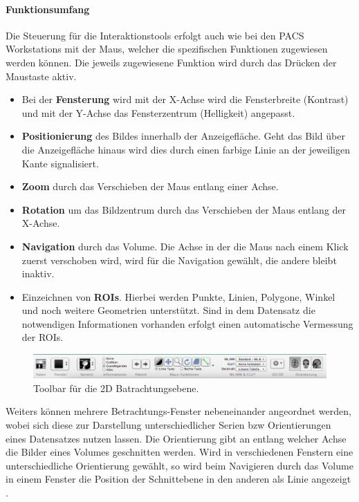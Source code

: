 \paragraph{Funktionsumfang}
Die Steuerung für die Interaktionstools erfolgt auch wie bei den PACS Workstations mit der Maus, 
welcher die spezifischen Funktionen zugewiesen werden können. Die jeweils zugewiesene Funktion wird durch das Drücken der Maustaste aktiv.
\begin{itemize}
	\item Bei der \textbf{Fensterung} wird mit der X-Achse wird die Fensterbreite (Kontrast) und mit der Y-Achse das Fensterzentrum (Helligkeit) angepasst.
	\item \textbf{Positionierung} des Bildes innerhalb der Anzeigefläche. Geht das Bild über die Anzeigefläche hinaus wird dies durch einen farbige Linie an der jeweiligen Kante signalisiert.
	\item \textbf{Zoom} durch das Verschieben der Maus entlang einer Achse.
	\item \textbf{Rotation} um das Bildzentrum durch das Verschieben  der Maus entlang der X-Achse.
	\item \textbf{Navigation} durch das Volume. Die Achse in der die Maus nach einem Klick zuerst verschoben wird, wird für die Navigation gewählt, die andere bleibt inaktiv.
	\item Einzeichnen von \textbf{ROIs}. Hierbei werden Punkte, Linien, Polygone, Winkel und noch weitere Geometrien unterstützt. 
		Sind in dem Datensatz die notwendigen Informationen vorhanden erfolgt einen automatische Vermessung der ROIs.
\end{itemize}
\begin{figure}[t]
	\centering
	\includegraphics[width=0.8\linewidth]{img/c2_osirix_2d_view_toolbar.jpg}
	\caption{Toolbar für die 2D Batrachtungsebene.}
\end{figure}
Weiters können mehrere Betrachtungs-Fenster nebeneinander angeordnet werden, wobei sich diese zur Darstellung unterschiedlicher Serien bzw Orientierungen eines Datensatzes nutzen lassen. 
Die Orientierung gibt an entlang welcher Achse die Bilder eines Volumes geschnitten werden.
Wird in verschiedenen Fenstern eine unterschiedliche Orientierung gewählt,
so wird beim Navigieren durch das Volume in einem Fenster die Position der Schnittebene in den anderen als Linie angezeigt \cite{osirix}.
